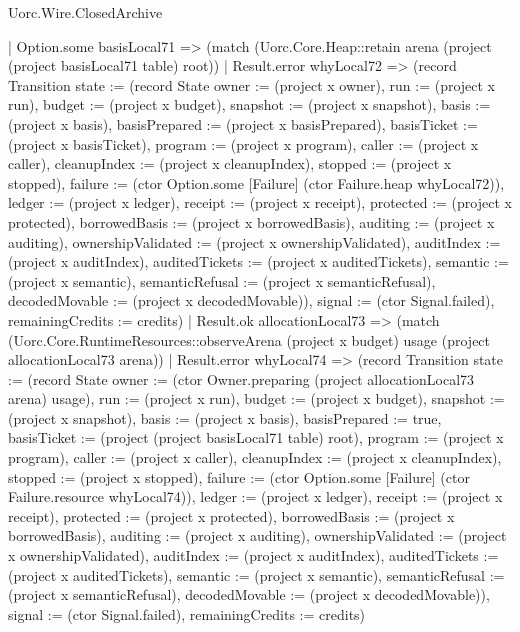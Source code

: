 \begin{lexlean}{Uorc.Wire.ClosedArchive}
\begin{semanticmodule}
{          | Option.some basisLocal71 => (match (Uorc.Core.Heap::retain arena (project (project basisLocal71 table) root))
            | Result.error whyLocal72 => (record Transition {state := (record State {owner := (project x owner), run := (project x run), budget := (project x budget), snapshot := (project x snapshot), basis := (project x basis), basisPrepared := (project x basisPrepared), basisTicket := (project x basisTicket), program := (project x program), caller := (project x caller), cleanupIndex := (project x cleanupIndex), stopped := (project x stopped), failure := (ctor Option.some [Failure] (ctor Failure.heap whyLocal72)), ledger := (project x ledger), receipt := (project x receipt), protected := (project x protected), borrowedBasis := (project x borrowedBasis), auditing := (project x auditing), ownershipValidated := (project x ownershipValidated), auditIndex := (project x auditIndex), auditedTickets := (project x auditedTickets), semantic := (project x semantic), semanticRefusal := (project x semanticRefusal), decodedMovable := (project x decodedMovable)}), signal := (ctor Signal.failed), remainingCredits := credits})
            | Result.ok allocationLocal73 => (match (Uorc.Core.RuntimeResources::observeArena (project x budget) usage (project allocationLocal73 arena))
              | Result.error whyLocal74 => (record Transition {state := (record State {owner := (ctor Owner.preparing (project allocationLocal73 arena) usage), run := (project x run), budget := (project x budget), snapshot := (project x snapshot), basis := (project x basis), basisPrepared := true, basisTicket := (project (project basisLocal71 table) root), program := (project x program), caller := (project x caller), cleanupIndex := (project x cleanupIndex), stopped := (project x stopped), failure := (ctor Option.some [Failure] (ctor Failure.resource whyLocal74)), ledger := (project x ledger), receipt := (project x receipt), protected := (project x protected), borrowedBasis := (project x borrowedBasis), auditing := (project x auditing), ownershipValidated := (project x ownershipValidated), auditIndex := (project x auditIndex), auditedTickets := (project x auditedTickets), semantic := (project x semantic), semanticRefusal := (project x semanticRefusal), decodedMovable := (project x decodedMovable)}), signal := (ctor Signal.failed), remainingCredits := credits})
}
\end{semanticmodule}
\end{lexlean}
